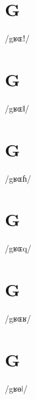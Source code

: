 \documentclass[10pt,a4paper,twoside]{book}
\begin{document}
\section*{G}

\begin{multicols}{3}
 {/gʁɶǃ/} {}
\end{multicols}

\section*{G}

\begin{multicols}{3}
 {/gʁɶǁ/} {}
\end{multicols}

\section*{G}

\begin{multicols}{3}
 {/gʁɶɦ/} {}
\end{multicols}

\section*{G}

\begin{multicols}{3}
 {/gʁɶq/} {}
\end{multicols}

\section*{G}

\begin{multicols}{3}
 {/gʁɶʁ/} {}
\end{multicols}

\section*{G}

\begin{multicols}{3}
 {/gʁɵǀ/} {}
\end{multicols}
\end{document}
